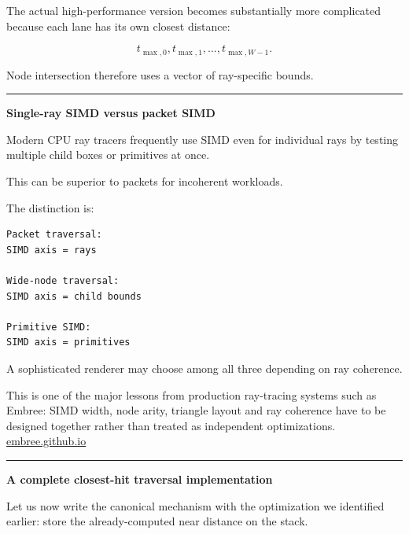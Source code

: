 The actual high-performance version becomes substantially more complicated because each lane has its own closest distance:

\[
t_{\max,0},
t_{\max,1},
\dots,
t_{\max,W-1}.
\]

Node intersection therefore uses a vector of ray-specific bounds.

\begin{center}\rule{0.5\linewidth}{0.5pt}\end{center}

\textbf{Single-ray SIMD versus packet SIMD}

Modern CPU ray tracers frequently use SIMD even for individual rays by testing multiple child boxes or primitives at once.

This can be superior to packets for incoherent workloads.

The distinction is:

\begin{verbatim}
Packet traversal:
SIMD axis = rays

Wide-node traversal:
SIMD axis = child bounds

Primitive SIMD:
SIMD axis = primitives
\end{verbatim}

A sophisticated renderer may choose among all three depending on ray coherence.

This is one of the major lessons from production ray-tracing systems such as Embree: SIMD width, node arity, triangle layout and ray coherence have to be designed together rather than treated as independent optimizations. \href{https://embree.github.io/papers/2014-Siggraph-Embree.pdf?utm_source=chatgpt.com}{embree.github.io}

\begin{center}\rule{0.5\linewidth}{0.5pt}\end{center}

\textbf{A complete closest-hit traversal implementation}

Let us now write the canonical mechanism with the optimization we identified earlier: store the already-computed near distance on the stack.

